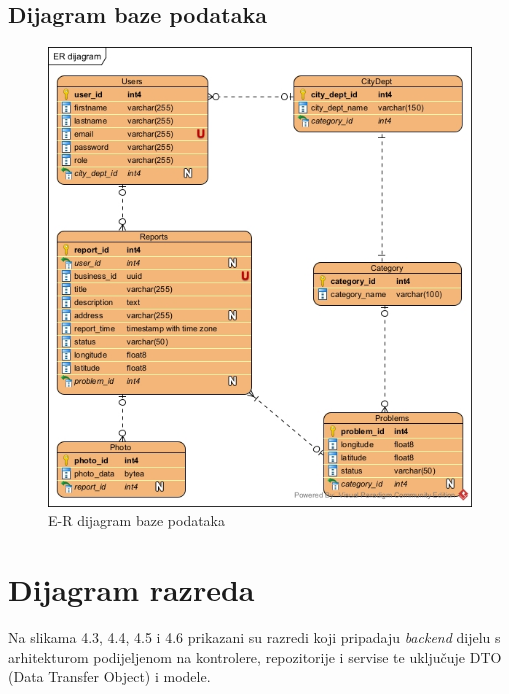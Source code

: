 \subsection{Dijagram baze podataka}

\begin{figure}[H]
	\includegraphics[scale=0.75]{slike/ERD-model} %
	\centering
	\caption{E-R dijagram baze podataka}
	\label{fig:ERdijagramBazePodataka}
\end{figure}

\eject


\section{Dijagram razreda}

Na slikama 4.3, 4.4, 4.5 i 4.6 prikazani su razredi koji pripadaju \textit{backend} dijelu
s arhitekturom podijeljenom na kontrolere, repozitorije i servise te uključuje DTO
(Data Transfer Object) i modele. \newline

